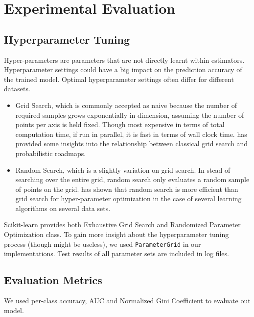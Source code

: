 \documentclass{standalone}
\begin{document}
\section{Experimental Evaluation}\label{evam}

\subsection{Hyperparameter Tuning}

Hyper-parameters are parameters that are not directly learnt within estimators.
Hyperparameter settings could have a big impact on the prediction accuracy of
the trained model. Optimal hyperparameter settings often differ for different
datasets\cite{Alice:2015:Evaluating}.

\begin{itemize}
    \item Grid Search, which is commonly accepted as naive because the number
        of required samples grows exponentially in dimension, assuming the
        number of points per axis is held fixed. Though most expensive in terms
        of total computation time, if run in parallel, it is fast in terms of
        wall clock time. \cite{lavalle2004relationship} has provided some
        insights into the relationship between classical grid search and
        probabilistic roadmaps.
    \item Random Search, which is a slightly variation on grid search. In stead
        of searching over the entire grid, random search only evaluates a
        random sample of points on the grid. \cite{bergstra2012random} has
        shown that random search is  more efficient than grid search for
        hyper-parameter optimization in the case of several learning algorithms
        on several data sets.
\end{itemize}

Scikit-learn provides both Exhaustive Grid Search\cite{Scikit:grid} and
Randomized Parameter Optimization\cite{Scikit:random} class. To gain more
insight about the hyperparameter tuning process (though might be useless), we
used \verb|ParameterGrid|\cite{Scikit:random} in our implementations. Test
results of all parameter sets are included in log files.

\subsection{Evaluation Metrics}

We used per-class accuracy, AUC and Normalized Gini Coefficient to evaluate out
model.
\end{document}
